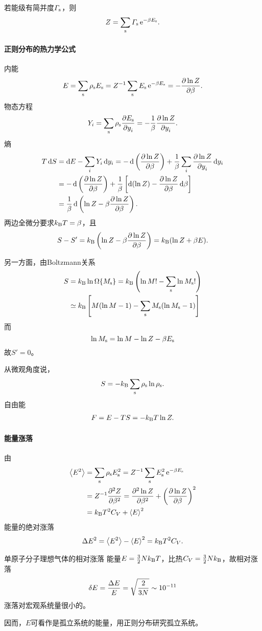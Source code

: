 若能级有简并度$\varGamma_\st$，则 
\begin{align}
	Z=\sum_\st\varGamma_\st\e{-\beta E_\st}.
\end{align}
\paragraph*{正则分布的热力学公式}内能
\begin{align}
	E=\sum_\st\rho_\st E_\st=Z^{-1}\sum_\st E_\st\e{-\beta E_\st}=-\pv{\ln Z}\beta.
\end{align}
物态方程
\begin{align}
	Y_i=\sum_\st\rho_\st\pv{E_\st}{y_i}=-\frac1\beta\pv{\ln Z}{y_i}.
\end{align}
熵
\begin{align*}
	T\d S&=\d E-\sum_i Y_i\d y_i=-\d\kh{\pv{\ln Z}\beta}+\frac1\beta\sum_i\pv{\ln Z}{y_i}\d y_i\\
	&=-\d\kh{\pv{\ln Z}\beta}+\frac1\beta\fkh{\d(\ln Z)-\pv{\ln Z}\beta\d\beta}\\
	&=\frac1\beta\d\kh{\ln Z-\beta\pv{\ln Z}\beta}.
\end{align*}
两边全微分要求$\kB T=\beta$，且 
\begin{align}
	S-S'=\kB\kh{\ln Z-\beta\pv{\ln Z}\beta}=\kB(\ln Z+\beta E).
\end{align}

另一方面，由Boltzmann关系
\begin{align*}
	S&=\kB\ln\Omega\{M_\st\}=\kB\kh{\ln M!-\sum_\st\ln M_\st!}\\
	&\simeq\kB\fkh{M(\ln M-1)-\sum_\st M_\st(\ln M_\st-1)}
\end{align*}
而
\[
	\ln M_\st=\ln M-\ln Z-\beta E_\st
\]
故$S'=0$。

从微观角度说，
\begin{align}
	S=-\kB\sum_\st\rho_\st\ln\rho_\st.
\end{align}
自由能
\begin{align}
	F=E-TS=-\kB T\ln Z.
\end{align}
\paragraph*{能量涨落}由
\begin{align*}
	\ave{E^2}&=\sum_\st\rho_\st E_\st^2=Z^{-1}\sum_\st E_\st^2\e{-\beta E_\st}\\
	&=Z^{-1}\pv[2]Z\beta=\pv[2]{\ln Z}\beta+\kh{\pv{\ln Z}\beta}^2\\
	&=\kB T^2C_V+\ave E^2
\end{align*}
能量的绝对涨落
\begin{align}
	\D E^2=\ave{E^2}-\ave E^2=\kB T^2C_V.
\end{align}
\begin{example}{单原子分子理想气体的相对涨落}{}
	能量$E=\frac32 N\kB T$，比热$C_V=\frac32N\kB$，故相对涨落
	\[
		\vd E=\frac{\D E}E=\sqrt{\frac2{3N}}\sim 10^{-11}
	\]
	涨落对宏观系统量很小的。
\end{example}
因而，$E$可看作是孤立系统的能量，用正则分布研究孤立系统。
